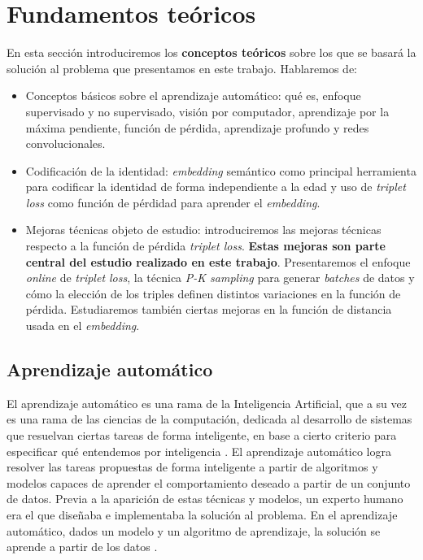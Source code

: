 \chapter{Fundamentos teóricos} \label{ich:fundamentos_teoricos}

En esta sección introduciremos los \textbf{conceptos teóricos} sobre los que se basará la solución al problema que presentamos en este trabajo. Hablaremos de:

\begin{itemize}
	\item Conceptos básicos sobre el aprendizaje automático: qué es, enfoque supervisado y no supervisado, visión por computador, aprendizaje por la máxima pendiente, función de pérdida, aprendizaje profundo y redes convolucionales.
	\item Codificación de la identidad: \textit{embedding} semántico como principal herramienta para codificar la identidad de forma independiente a la edad y uso de \textit{triplet loss} como función de pérdidad para aprender el \textit{embedding}.
	\item Mejoras técnicas objeto de estudio: introduciremos las mejoras técnicas respecto a la función de pérdida \textit{triplet loss}. \textbf{Estas mejoras son parte central del estudio realizado en este trabajo}. Presentaremos el enfoque \textit{online} de \textit{triplet loss}, la técnica \textit{P-K sampling} para generar \textit{batches} de datos y cómo la elección de los triples definen distintos variaciones en la función de pérdida. Estudiaremos también ciertas mejoras en la función de distancia usada en el \textit{embedding}.
\end{itemize}

\section{Aprendizaje automático}

El aprendizaje automático es una rama de la Inteligencia Artificial, que a su vez es una rama de las ciencias de la computación, dedicada al desarrollo de sistemas que resuelvan ciertas tareas de forma inteligente, en base a cierto criterio para especificar qué entendemos por inteligencia \cite{informatica:libro_europa_IA}. El aprendizaje automático logra resolver las tareas propuestas de forma inteligente a partir de algoritmos y modelos capaces de aprender el comportamiento deseado a partir de un conjunto de datos. Previa a la aparición de estas técnicas y modelos, un experto humano era el que diseñaba e implementaba la solución al problema. En el aprendizaje automático, dados un modelo y un algoritmo de aprendizaje, la solución se aprende a partir de los datos \cite{informatica:libro_europa_IA}.

